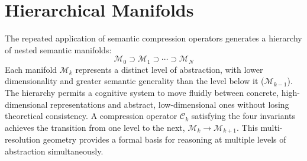 \section{Hierarchical Manifolds}

The repeated application of semantic compression operators generates a hierarchy of nested semantic manifolds:
\begin{equation}
\mathcal{M}_0 \supset \mathcal{M}_1 \supset \cdots \supset \mathcal{M}_N
\end{equation}
Each manifold \(\mathcal{M}_k\) represents a distinct level of abstraction, with lower dimensionality and greater semantic generality than the level below it (\(\mathcal{M}_{k-1}\)). The hierarchy permits a cognitive system to move fluidly between concrete, high-dimensional representations and abstract, low-dimensional ones without losing theoretical consistency. A compression operator \(\mathcal{C}_k\) satisfying the four invariants achieves the transition from one level to the next, \(\mathcal{M}_k \to \mathcal{M}_{k+1}\). This multi-resolution geometry provides a formal basis for reasoning at multiple levels of abstraction simultaneously.
